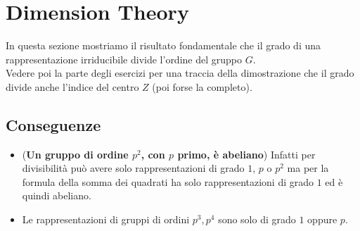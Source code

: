 \documentclass[a4paper,NoNotes,GeneralMath]{stdmdoc}
\begin{document}
	\section{Dimension Theory}
	In questa sezione mostriamo il risultato fondamentale che il grado di una rappresentazione irriducibile divide l'ordine del gruppo $G$.  \\
	Vedere poi la parte degli esercizi per una traccia della dimostrazione che il grado divide anche l'indice del centro $Z$ (poi forse la completo). \\
%

	\subsection{Conseguenze}
	\begin{itemize}
		\item ({\bf Un gruppo di ordine $p^2$, con $p$ primo, è abeliano}) Infatti per divisibilità può avere solo rappresentazioni di grado $1$, $p$ o $p^2$ ma per la formula della somma dei quadrati ha solo rappresentazioni di grado $1$ ed è quindi abeliano.
		\item Le rappresentazioni di gruppi di ordini $p^3, p^4$ sono solo di grado $1$ oppure $p$.
	\end{itemize}

\end{document}
